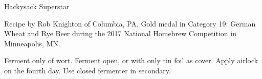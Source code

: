 \begin{recipe}{Hackysack Superstar} %

\begin{aboutblock}
Recipe by Rob Knighton of Columbia, PA. Gold medal in Category 19: German
Wheat and Rye Beer during the 2017 National Homebrew Competition in Minneapolis,
MN. \sourceaha
\end{aboutblock}


\begin{methodandtiming}
 
\begin{mashsteps}
\end{mashsteps}

\begin{fermentationsteps}
\end{fermentationsteps}

\begin{directions}
Ferment only  of wort. Ferment open, or with only tin foil as
cover. Apply airlock on the fourth day. Use closed fermenter in secondary.
\end{directions}

\end{methodandtiming}

\recipebreak

\begin{ingredientsblock}

\begin{malts}
\end{malts}

\begin{hops}
\end{hops}


\begin{twists}
\end{twists}

\end{ingredientsblock}

\end{recipe}

